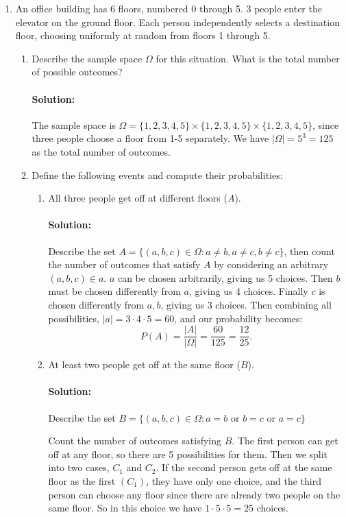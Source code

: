 \documentclass{article}
\begin{document}
\begin{enumerate} 
    \item  An office building has 6 floors, numbered 0 through 5. 3 people enter the elevator on the ground floor. Each person independently selects a destination floor, choosing uniformly at random from floors 1 through 5.
        \begin{enumerate}
            \item Describe the sample space $\Omega$ for this situation. What is the total number of possible outcomes?
                \paragraph{Solution: }The sample space is $\Omega=\{1,2,3,4,5\}\times \{1,2,3,4,5\}\times \{1,2,3,4,5\}$, since three people choose a floor from 1-5 separately. We have $|\Omega|=5^3=125$ as the total number of outcomes.
            \item Define the following events and compute their probabilities: %
                \begin{enumerate}
                    \item All three people get off at different floors ($A$).
                        \paragraph{Solution: }Describe the set $A=\{(a,b,c)\in \Omega:a\neq b,a\neq c,b\neq c\} $, then count the number of outcomes that satisfy $A$ by considering an arbitrary $(a,b,c)\in a$. $a$ can be chosen arbitrarily, giving us 5 choices. Then $b$ must be chosen differently from $a$, giving us 4 choices. Finally $c$ is chosen differently from $a,b$, giving us $3$ choices. Then combining all possibilities, $|a|=3\cdot 4\cdot 5=60$, and our probability becomes:
                        \[
                        P(A)=\frac{|A|}{|\Omega|}=\frac{60}{125}=\frac{12}{25}
                        .\] 
                    \item At least two people get off at the same floor ($B$).
                        \paragraph{Solution: }Describe the set $B=\{(a,b,c)\in \Omega:a=b \text{ or } b=c \text{ or }a=c\} $

                        Count the number of outcomes satisfying $B$. The first person can get off at any floor, so there are 5 possibilities for them. Then we split into two cases, $C_1$ and $C_2$. If the second person gets off at the same floor as the first $(C_1)$, they have only one choice, and the third person can choose any floor since there are already two people on the same floor. So in this choice we have $1\cdot 5\cdot 5=25$ choices.


\end{enumerate}
\end{enumerate}
\end{enumerate}
\end{document}
